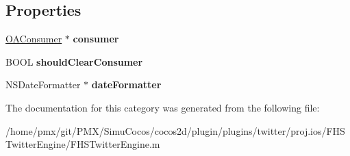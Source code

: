 \subsection*{Properties}
\begin{DoxyCompactItemize}
\item 
\mbox{\label{categoryFHSTwitterEngine_07_08_a6acaeb8f4c3f1124d5086c439ba2bafd}} 
\hyperlink{interfaceOAConsumer}{O\+A\+Consumer} $\ast$ {\bfseries consumer}
\item 
\mbox{\label{categoryFHSTwitterEngine_07_08_a809e5a9ab2a4be8f7688759fd7643429}} 
B\+O\+OL {\bfseries should\+Clear\+Consumer}
\item 
\mbox{\label{categoryFHSTwitterEngine_07_08_ac4f5b1507a3ccfc6483ab0a303569972}} 
N\+S\+Date\+Formatter $\ast$ {\bfseries date\+Formatter}
\end{DoxyCompactItemize}


The documentation for this category was generated from the following file\+:\begin{DoxyCompactItemize}
\item 
/home/pmx/git/\+P\+M\+X/\+Simu\+Cocos/cocos2d/plugin/plugins/twitter/proj.\+ios/\+F\+H\+S\+Twitter\+Engine/F\+H\+S\+Twitter\+Engine.\+m\end{DoxyCompactItemize}

